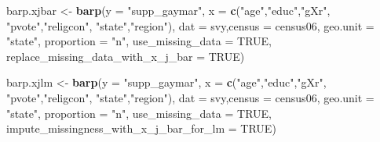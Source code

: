 \documentclass[]{article}
\newenvironment{Shaded}{\begin{snugshade}}{\end{snugshade}}
\newcommand{\KeywordTok}[1]{\textcolor[rgb]{0.13,0.29,0.53}{\textbf{#1}}}
\newcommand{\DataTypeTok}[1]{\textcolor[rgb]{0.13,0.29,0.53}{#1}}
\newcommand{\DecValTok}[1]{\textcolor[rgb]{0.00,0.00,0.81}{#1}}
\newcommand{\StringTok}[1]{\textcolor[rgb]{0.31,0.60,0.02}{#1}}
\newcommand{\OtherTok}[1]{\textcolor[rgb]{0.56,0.35,0.01}{#1}}
\newcommand{\OperatorTok}[1]{\textcolor[rgb]{0.81,0.36,0.00}{\textbf{#1}}}
\newcommand{\NormalTok}[1]{#1}
\begin{document}
\begin{Shaded}
\begin{Highlighting}[]
\NormalTok{barp.xjbar <-}\StringTok{ }\KeywordTok{barp}\NormalTok{(}\DataTypeTok{y =} \StringTok{"supp_gaymar"}\NormalTok{,}
                 \DataTypeTok{x =} \KeywordTok{c}\NormalTok{(}\StringTok{"age"}\NormalTok{,}\StringTok{"educ"}\NormalTok{,}\StringTok{"gXr"}\NormalTok{,}
                       \StringTok{"pvote"}\NormalTok{,}\StringTok{"religcon"}\NormalTok{,}
                       \StringTok{"state"}\NormalTok{,}\StringTok{"region"}\NormalTok{),}
                 \DataTypeTok{dat =}\NormalTok{ svy,}\DataTypeTok{census =}\NormalTok{ census06,}
                 \DataTypeTok{geo.unit =} \StringTok{"state"}\NormalTok{,}
                 \DataTypeTok{proportion =} \StringTok{"n"}\NormalTok{,}
                 \DataTypeTok{use_missing_data =} \OtherTok{TRUE}\NormalTok{,}
                 \DataTypeTok{replace_missing_data_with_x_j_bar =} \OtherTok{TRUE}\NormalTok{)}

\NormalTok{barp.xjlm <-}\StringTok{ }\KeywordTok{barp}\NormalTok{(}\DataTypeTok{y =} \StringTok{"supp_gaymar"}\NormalTok{,}
                 \DataTypeTok{x =} \KeywordTok{c}\NormalTok{(}\StringTok{"age"}\NormalTok{,}\StringTok{"educ"}\NormalTok{,}\StringTok{"gXr"}\NormalTok{,}
                       \StringTok{"pvote"}\NormalTok{,}\StringTok{"religcon"}\NormalTok{,}
                       \StringTok{"state"}\NormalTok{,}\StringTok{"region"}\NormalTok{),}
                 \DataTypeTok{dat =}\NormalTok{ svy,}\DataTypeTok{census =}\NormalTok{ census06,}
                 \DataTypeTok{geo.unit =} \StringTok{"state"}\NormalTok{,}
                 \DataTypeTok{proportion =} \StringTok{"n"}\NormalTok{,}
                 \DataTypeTok{use_missing_data =} \OtherTok{TRUE}\NormalTok{,}
                 \DataTypeTok{impute_missingness_with_x_j_bar_for_lm =} \OtherTok{TRUE}\NormalTok{)}
\end{Highlighting}
\end{Shaded}

\begin{Shaded}
\end{Shaded}
\end{document}
